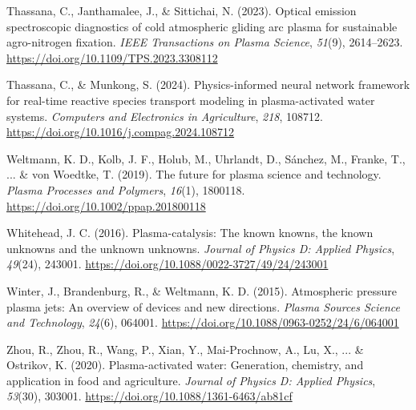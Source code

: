 Thassana, C., Janthamalee, J., \& Sittichai, N. (2023). Optical emission spectroscopic diagnostics of cold atmospheric gliding arc plasma for sustainable agro-nitrogen fixation. \textit{IEEE Transactions on Plasma Science}, \textit{51}(9), 2614--2623. \url{https://doi.org/10.1109/TPS.2023.3308112}

Thassana, C., \& Munkong, S. (2024). Physics-informed neural network framework for real-time reactive species transport modeling in plasma-activated water systems. \textit{Computers and Electronics in Agriculture}, \textit{218}, 108712. \url{https://doi.org/10.1016/j.compag.2024.108712}

Weltmann, K. D., Kolb, J. F., Holub, M., Uhrlandt, D., S\'{a}nchez, M., Franke, T., ... \& von Woedtke, T. (2019). The future for plasma science and technology. \textit{Plasma Processes and Polymers}, \textit{16}(1), 1800118. \url{https://doi.org/10.1002/ppap.201800118}

Whitehead, J. C. (2016). Plasma-catalysis: The known knowns, the known unknowns and the unknown unknowns. \textit{Journal of Physics D: Applied Physics}, \textit{49}(24), 243001. \url{https://doi.org/10.1088/0022-3727/49/24/243001}

Winter, J., Brandenburg, R., \& Weltmann, K. D. (2015). Atmospheric pressure plasma jets: An overview of devices and new directions. \textit{Plasma Sources Science and Technology}, \textit{24}(6), 064001. \url{https://doi.org/10.1088/0963-0252/24/6/064001}

Zhou, R., Zhou, R., Wang, P., Xian, Y., Mai-Prochnow, A., Lu, X., ... \& Ostrikov, K. (2020). Plasma-activated water: Generation, chemistry, and application in food and agriculture. \textit{Journal of Physics D: Applied Physics}, \textit{53}(30), 303001. \url{https://doi.org/10.1088/1361-6463/ab81cf}

\endgroup

\clearpage
